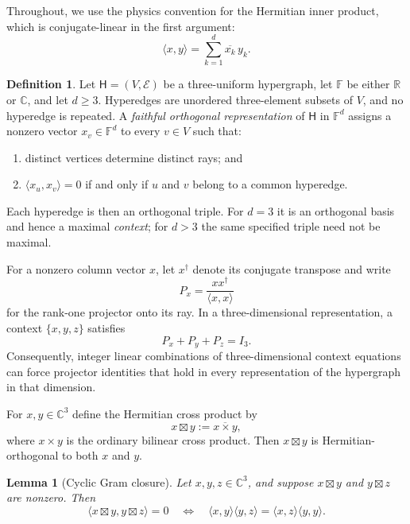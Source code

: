 \documentclass[twocolumn,aps,pra,floatfix,amsmath,amssymb,longbibliography]{revtex4-2}
\newtheorem{lemma}[theorem]{Lemma}
\theoremstyle{definition}
\newtheorem{definition}[theorem]{Definition}
\theoremstyle{remark}
\newcommand{\C}{\mathbb C}
\newcommand{\R}{\mathbb R}
\begin{document}
Throughout, we use the physics convention for the Hermitian inner product,
which is conjugate-linear in the first argument:
\begin{equation}
 \langle x,y\rangle=\sum_{k=1}^{d}\overline{x_k}\,y_k.
 \label{eq:inner-product}
\end{equation}

\begin{definition}
Let $\mathsf H=(V,\mathcal E)$ be a three-uniform hypergraph, let
$\mathbb F$ be either $\R$ or $\C$, and let $d\ge3$.
Hyperedges are unordered three-element subsets of $V$, and no hyperedge
is repeated.  A \emph{faithful orthogonal representation} of $\mathsf H$ in $\mathbb F^d$ assigns a nonzero
vector $x_v\in\mathbb F^d$ to every $v\in V$ such that:
\begin{enumerate}
\item distinct vertices determine distinct rays; and
\item $\langle x_u,x_v\rangle=0$ if and only if $u$ and $v$ belong to a
common hyperedge.
\end{enumerate}
Each hyperedge is then an orthogonal triple.  For $d=3$ it is an orthogonal
basis and hence a maximal \emph{context}; for $d>3$ the same specified triple
need not be maximal.
\end{definition}

For a nonzero column vector $x$, let $x^\dagger$ denote its conjugate
transpose and write
\begin{equation}
 P_x=\frac{xx^\dagger}{\langle x,x\rangle}
 \label{eq:projector}
\end{equation}
for the rank-one projector onto its ray.  In a three-dimensional
representation, a context $\{x,y,z\}$ satisfies
\begin{equation}
 P_x+P_y+P_z=I_3.
 \label{eq:context-sum}
\end{equation}
Consequently, integer linear combinations of three-dimensional context
equations can force projector identities that hold in every representation
of the hypergraph in that dimension.

For $x,y\in\C^3$ define the Hermitian cross product by
\begin{equation}
 x\boxtimes y:=\overline{x\times y},
 \label{eq:hcross}
\end{equation}
where $x\times y$ is the ordinary bilinear cross product.  Then
$x\boxtimes y$ is Hermitian-orthogonal to both $x$ and $y$.

\begin{lemma}[Cyclic Gram closure]
\label{lem:gram-closure}
Let $x,y,z\in\C^3$, and suppose $x\boxtimes y$ and
$y\boxtimes z$ are nonzero.  Then
\begin{equation}
 \langle x\boxtimes y,y\boxtimes z\rangle=0
 \quad\Longleftrightarrow\quad
 \langle x,y\rangle\langle y,z\rangle
 =\langle x,z\rangle\langle y,y\rangle.
 \label{eq:gram-closure}
\end{equation}
\end{lemma}
\end{document}
